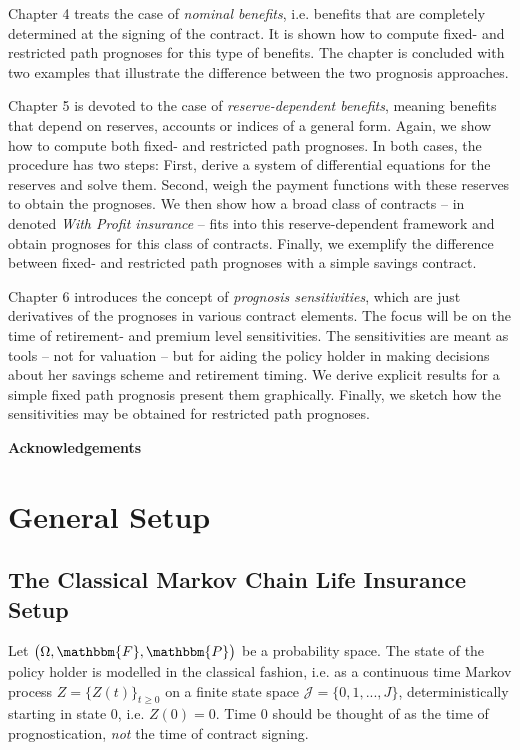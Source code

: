 \documentclass{article}
\newcommand{\1}[1]{\mathbbm{1}_{\left\lbrace #1 \right\rbrace}}
\theoremstyle{break}
\theoremstyle{remark}
\numberwithin{equation}{section}
\begin{document}
Chapter 4 treats the case of \textit{nominal benefits}, i.e. benefits that are completely determined at the signing of the contract. It is shown how to compute fixed- and restricted path prognoses for this type of benefits. The chapter is concluded with two examples that illustrate the difference between the two prognosis approaches.

Chapter 5 is devoted to the case of \textit{reserve-dependent benefits}, meaning benefits that depend on reserves, accounts or indices of a general form. Again, we show how to compute both fixed- and restricted path prognoses. In both cases, the procedure has two steps: First, derive a system of differential equations for the reserves and solve them. Second, weigh the payment functions with these reserves to obtain the prognoses. We then show how a broad class of contracts -- in \cite{Liv2Bog} denoted \textit{With Profit insurance} -- fits into this reserve-dependent framework and obtain prognoses for this class of contracts. Finally, we exemplify the difference between fixed- and restricted path prognoses with a simple savings contract.

Chapter 6 introduces the concept of \textit{prognosis sensitivities}, which are just derivatives of the prognoses in various contract elements. The focus will be on the time of retirement- and premium level sensitivities. The sensitivities are meant as tools -- not for valuation -- but for aiding the policy holder in making decisions about her savings scheme and retirement timing. We derive explicit results for a simple fixed path prognosis present them graphically. Finally, we sketch how the sensitivities may be obtained for restricted path prognoses.

\textbf{Acknowledgements}

\newpage

\section{General Setup}

\subsection{The Classical Markov Chain Life Insurance Setup}

Let $\left( \Omega, \mathbbm{F}, \mathbbm{P} \right)$ be a probability space. The state of the policy holder is modelled in the classical fashion, i.e. as a continuous time Markov process $Z = \{ Z(t) \}_{t \geq 0}$ on a finite state space $\mathcal{J}= \{ 0, 1, ..., J \} $, deterministically starting in state $0$, i.e. $Z(0) = 0$. Time 0 should be thought of as the time of prognostication, \textit{not} the time of contract signing.
\end{document}

